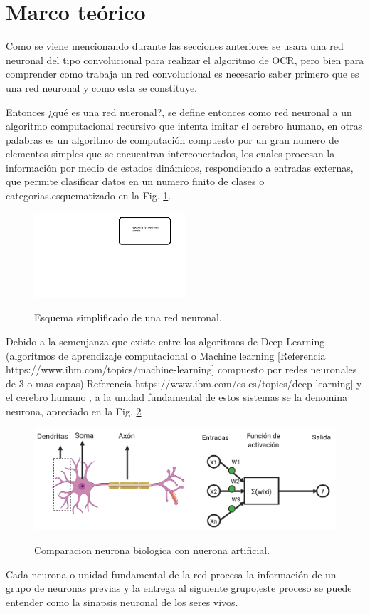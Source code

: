 \section{Marco teórico}
Como se viene mencionando durante las secciones anteriores se usara una red neuronal del tipo convolucional para realizar el algoritmo de OCR,
pero bien para comprender como trabaja un red convolucional es necesario saber primero que es una red neuronal y como esta se constituye.

Entonces ¿qué es una red nueronal?, se define entonces como red neuronal a un algoritmo computacional recursivo que intenta imitar el cerebro 
humano, en otras palabras es un algoritmo de computación compuesto por un gran numero de elementos simples que se 
encuentran interconectados, los cuales procesan la información por medio de estados dinámicos, respondiendo a entradas externas, que permite 
clasificar datos en un numero finito de clases o categorias.esquematizado en 
 la Fig. \ref*{fig:esquema-redes}.
\begin{figure}[h]
    \centering
    \includegraphics[width=0.5\textwidth]{imgs/Redes-esquema.jpg}
    \label{fig:esquema-redes}
    \caption{Esquema simplificado de una red neuronal.}
\end{figure}
Debido a la semenjanza que existe entre los algoritmos de Deep Learning (algoritmos de aprendizaje computacional o 
Machine learning [Referencia https://www.ibm.com/topics/machine-learning] compuesto por redes neuronales 
de 3 o mas capas)[Referencia https://www.ibm.com/es-es/topics/deep-learning] y el cerebro humano , a la 
unidad fundamental de estos sistemas se la denomina neurona, apreciado en la Fig. \ref*{fig:comparativa-neuronas}
\begin{figure}[h]
    \centering
    \includegraphics[width=1\textwidth]{imgs/comparacion-neurona-red.png}
    \label{fig:comparativa-neuronas}
    \caption{Comparacion neurona biologica con nuerona artificial.}
\end{figure}
Cada neurona o unidad fundamental de la red procesa la información de un grupo de neuronas previas y la entrega al siguiente grupo,este proceso 
se puede entender como la sinapsis neuronal de los seres vivos.

